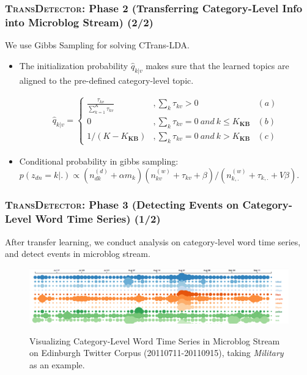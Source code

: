 \begin{frame}
\frametitle{\textsc{TransDetector}: Phase 2 (Transferring Category-Level Info into Microblog Stream) (2/2)}	
We use Gibbs Sampling for solving CTrans-LDA.
\begin{itemize}
	\item The initialization probability \(\hat{q}_{k|v}\) makes sure that the learned topics are aligned to the pre-defined category-level topic.
\setlength{\abovedisplayskip}{0pt}
\setlength{\belowdisplayskip}{0pt}
\begin{scriptsize} 
\begin{equation}
\label{eq:initProbability}
\begin{aligned}
\hat{q}_{k|v}=
\left\{ \begin{aligned}
\frac{\tau_{kv}}{\sum_{k=1}^{K}\tau_{kv}} &,\sum_{k}\tau_{kv}>0 & (a)\\
0&, \sum_{k}\tau_{kv}=0 \ and \ k \leq K_{\bm{KB}} & (b)\\
1/(K-K_{\bm{KB}})&,\sum_{k}\tau_{kv}=0 \ and \ k > K_{\bm{KB}} & (c)
\end{aligned}\right.
\end{aligned}
\end{equation}
\end{scriptsize}
\item Conditional probability in gibbs sampling:
\(p(z_{dn}=k|.)\propto (n^{(d)}_{dk}+\alpha m_k)(n^{(w)}_{kv}+\tau_{kv}+\beta)/(n^{(w)}_{k,.}+\tau_{k,.}+V\beta)\).
\end{itemize}
\end{frame}


\begin{frame}
\frametitle{\textsc{TransDetector}: Phase 3 (Detecting Events on Category-Level Word Time Series) (1/2)}	
After transfer learning, we conduct analysis on category-level word time series, and detect events in microblog stream.
\begin{figure}[h]
		\setlength{\abovecaptionskip}{0.cm}
        \setlength{\belowcaptionskip}{0.cm}
        \centering
        \caption{Visualizing Category-Level Word Time Series in Microblog Stream on Edinburgh Twitter Corpus (20110711-20110915), taking \textit{Military} as an example.}
        \includegraphics[width=.99\columnwidth]{img/screenShot.png}
        \label{fig:hood}
\end{figure}
\end{frame}


